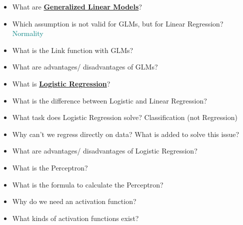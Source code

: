 \documentclass{report}
\newcommand{\asw}[2][teal]{}
\renewcommand{\asw}[2][teal]{\textcolor{#1}{#2}}
\begin{document}
\begin{itemize}
	\item What are \textbf{\underline{Generalized Linear Models}}?
	\asw{\newline }
	\item Which assumption is not valid for GLMs, but for Linear Regression?
	\asw{\newline Normality}
	\item What is the Link function with GLMs?
	\asw{\newline }
	\item What are advantages/ disadvantages of GLMs?
	\asw{\newline }
	
	\item What is \textbf{\underline{Logistic Regression}}?
	\asw{\newline }
	\item What is the difference between Logistic and Linear Regression?
	\asw{\newline }
	\item What task does Logistic Regression solve?
	\asw{\newline }Classification (not Regression)
	\item Why can't we regress directly on data? What is added to solve this issue?
	\asw{\newline }
	\item What are advantages/ disadvantages of Logistic Regression?
	\asw{\newline }
	\item What is the Perceptron?
	\asw{\newline }
	\item What is the formula to calculate the Perceptron?
	\asw{\newline }
	\item Why do we need an activation function?
	\asw{\newline }
	\item What kinds of activation functions exist?
	\asw{\newline }
	

\end{itemize}
\end{document}
